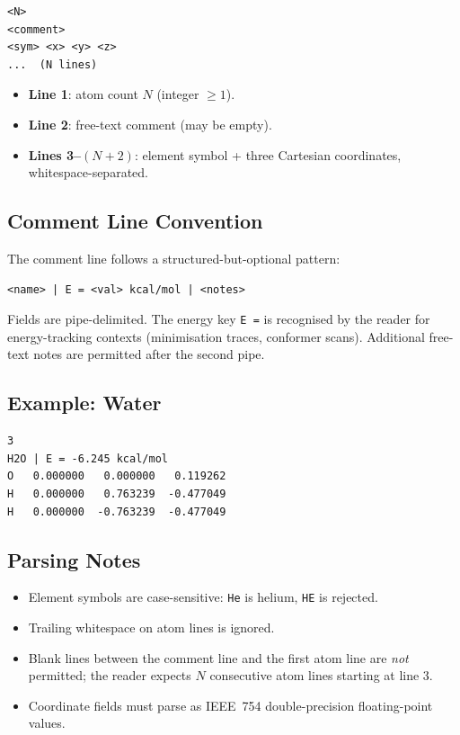 \documentclass[12pt, a4paper, oneside]{article}
\begin{document}
\begin{lstlisting}[language={},frame=single]
<N>
<comment>
<sym> <x> <y> <z>
...  (N lines)
\end{lstlisting}

\begin{itemize}
  \item \textbf{Line 1}: atom count $N$ (integer $\ge 1$).
  \item \textbf{Line 2}: free-text comment (may be empty).
  \item \textbf{Lines 3--$(N{+}2)$}: element symbol + three Cartesian
        coordinates, whitespace-separated.
\end{itemize}

\subsection{Comment Line Convention}

The comment line follows a structured-but-optional pattern:

\begin{lstlisting}[language={},frame=single]
<name> | E = <val> kcal/mol | <notes>
\end{lstlisting}

Fields are pipe-delimited.  The energy key \texttt{E =} is
recognised by the reader for energy-tracking contexts (minimisation
traces, conformer scans).  Additional free-text notes are permitted
after the second pipe.

\subsection{Example: Water}

\begin{lstlisting}[language={},frame=single]
3
H2O | E = -6.245 kcal/mol
O   0.000000   0.000000   0.119262
H   0.000000   0.763239  -0.477049
H   0.000000  -0.763239  -0.477049
\end{lstlisting}

\subsection{Parsing Notes}

\begin{itemize}
  \item Element symbols are case-sensitive: \texttt{He} is helium,
        \texttt{HE} is rejected.
  \item Trailing whitespace on atom lines is ignored.
  \item Blank lines between the comment line and the first atom line
        are \emph{not} permitted; the reader expects $N$ consecutive
        atom lines starting at line 3.
  \item Coordinate fields must parse as IEEE~754 double-precision
        floating-point values.
\end{itemize}
\end{document}
